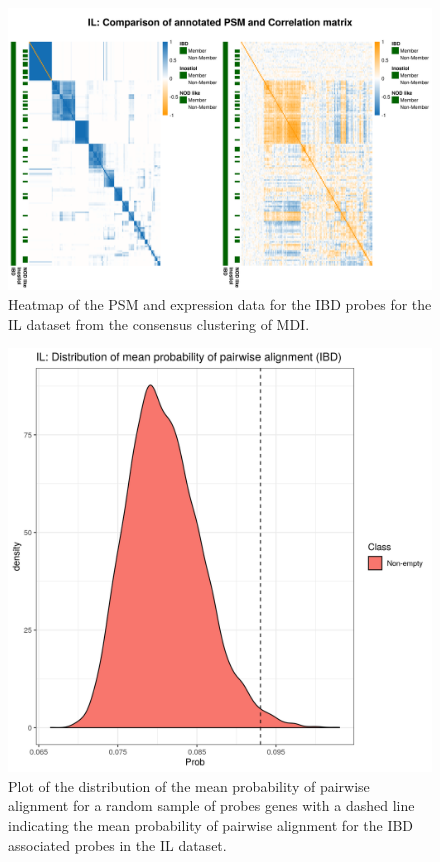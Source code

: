 \documentclass[12pt]{article} %
\begin{document}
	
	\begin{figure}
		\centering
		\includegraphics[scale=0.75]{Images/Biology_data/Set_1000/All_datasets/Heatmaps/KEGG_INFLAMMATORY_BOWEL_DISEASE/IL_comp_psm_corr.png}
		\caption{Heatmap of the PSM and expression data for the IBD probes for the IL dataset from the consensus clustering of MDI.}
		\label{fig:results:cedar_2:mdi_il_ibd_psm_cor}
	\end{figure}
	
	
	\begin{figure}[h]
		\centering
		\includegraphics[scale=0.75]{Images/Biology_data/Set_1000/All_datasets/Mean_alignment_probability/IL_KEGG_INFLAMMATORY_BOWEL_DISEASE.png}
		\caption{Plot of the distribution of the mean probability of pairwise alignment for a random sample of probes genes with a dashed line indicating the mean probability of pairwise alignment for the IBD associated probes in the IL dataset.}
		\label{fig:results:cedar_2:mdi_il_ibd_alignment_prob_distn}
	\end{figure}
	
\end{document}
